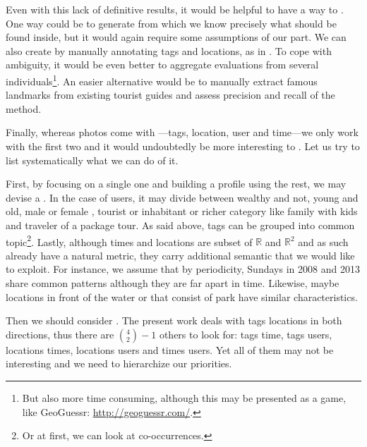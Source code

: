 Even with this lack of definitive results, it would be helpful to have a way
to . One way could be to generate
 from which we know precisely what should be found
inside, but it would again require some assumptions of our part. We can also
create  by manually annotating tags and
locations, as in \cite{Rattenbury2009}. To cope with ambiguity, it would be
even better to aggregate evaluations from several individuals\footnote{But
also more time consuming, although this may be presented as a game, like
GeoGuessr: \url{http://geoguessr.com/}.}. An easier alternative would be to
manually extract famous landmarks from existing tourist guides and assess
precision and recall of the method.

\medskip

Finally, whereas photos come with ---tags, location, user and time---we only work with the first two
and it would undoubtedly be more interesting to .
Let us try to list systematically what we can do of it.

First, by focusing on a single one and building a profile using the rest, we
may devise a .
In the case of users, it may divide between wealthy and not, young and old,
male or female \cite{gender}, tourist or inhabitant or richer category like
family with kids and traveler of a package tour. As said above, tags can be
grouped into common topic\footnote{Or at first, we can look at
co-occurrences.}. Lastly, although times and locations are subset of
$\mathbb{R}$ and $\mathbb{R}^2$ and as such already have a natural metric,
they carry additional semantic that we would like to exploit. For instance, we
assume that by periodicity, Sundays in 2008 and 2013 share common patterns
although they are far apart in time. Likewise, maybe locations in front of the
water or that consist of park have similar characteristics.

Then we should consider . The present work deals
with tags \texrel locations in both directions, thus there are $\binom{4}{2} -
1$ others to look for: tags \texrel time, tags \texrel users, locations \texrel
times, locations \texrel users and times \texrel users. Yet all of them may
not be interesting and we need to hierarchize our priorities. 

